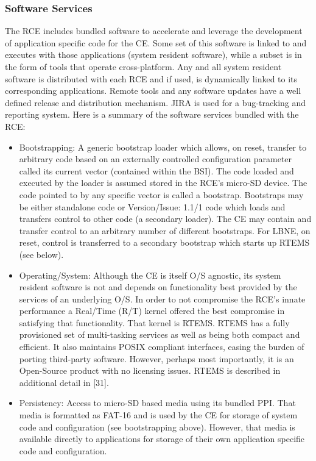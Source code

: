 \subsubsection{Software Services}
\label{sec:Services}
The RCE includes bundled software to accelerate and leverage 
the development of application specific code for the CE. 
Some set of this software is linked to and executes with those 
applications (system resident software), while a subset is in the 
form of tools that operate cross-platform. 
Any and all system resident software is distributed with each RCE 
and if used, is dynamically linked to its corresponding applications. 
Remote tools and any software updates have a well defined release and
distribution mechanism. 
JIRA is used for a bug-tracking and reporting system. 
Here is a summary of the software services bundled with the RCE:
\begin{itemize}
\item Bootstrapping: A generic bootstrap loader which allows, on reset, transfer to arbitrary code based on an externally controlled configuration parameter called its current vector (contained within the BSI). The code loaded and executed by the loader is assumed stored in the RCE's micro-SD device. The code pointed to by any specific vector is called a bootstrap. Bootstraps may be either standalone code or Version/Issue: 1.1/1
code which loads and transfers control to other code (a secondary loader). The CE may contain and transfer control to an arbitrary number of different bootstraps. For LBNE, on reset, control is transferred to a secondary bootstrap which starts up RTEMS (see below).
\item Operating/System: Although the CE is itself O/S agnostic, its system resident software is not and depends on functionality best provided by the services of an underlying O/S. In order to not compromise the RCE's innate performance a Real/Time (R/T) kernel offered the best compromise in satisfying that functionality. That kernel is RTEMS. RTEMS has a fully provisioned set of multi-tasking services as well as being both compact and efficient. It also maintains POSIX compliant interfaces, easing the burden of porting third-party software. However, perhaps most importantly, it is an Open-Source product with no licensing issues. RTEMS is described in additional detail in [31].
\item Persistency:
Access to micro-SD based media using its bundled PPI. That media is formatted as FAT-16 and is used by the CE for storage of system code and configuration (see bootstrapping above). However, that media is available directly to applications for storage of their own application specific code and configuration.

\end{itemize}

